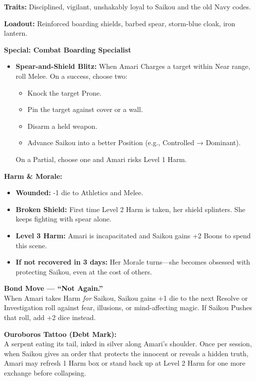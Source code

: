 \documentclass[11pt]{article}
\begin{document}
\textbf{Traits:}
Disciplined, vigilant, unshakably loyal to Saikou and the old Navy codes.

\textbf{Loadout:}
Reinforced boarding shields, barbed spear, storm-blue cloak, iron lantern.

\textbf{Special: Combat Boarding Specialist}
\begin{itemize}
  \item \textbf{Spear-and-Shield Blitz:} When Amari Charges a target within Near range, roll Melee. On a success, choose two:
  \begin{itemize}
    \item Knock the target Prone.
    \item Pin the target against cover or a wall.
    \item Disarm a held weapon.
    \item Advance Saikou into a better Position (e.g., Controlled → Dominant).
  \end{itemize}
  On a Partial, choose one and Amari risks Level 1 Harm.
\end{itemize}

\textbf{Harm \& Morale:}
\begin{itemize}
  \item \textbf{Wounded:} -1 die to Athletics and Melee.
  \item \textbf{Broken Shield:} First time Level 2 Harm is taken, her shield splinters. She keeps fighting with spear alone.
  \item \textbf{Level 3 Harm:} Amari is incapacitated and Saikou gains +2 Boons to spend this scene.
  \item \textbf{If not recovered in 3 days:} Her Morale turns---she becomes obsessed with protecting Saikou, even at the cost of others.
\end{itemize}

\textbf{Bond Move --- ``Not Again.''}\\
When Amari takes Harm \emph{for} Saikou, Saikou gains +1 die to the next Resolve or Investigation roll against fear, illusions, or mind-affecting magic.  
If Saikou Pushes that roll, add +2 dice instead.

\textbf{Ouroboros Tattoo (Debt Mark):}\\
A serpent eating its tail, inked in silver along Amari's shoulder.  
Once per session, when Saikou gives an order that protects the innocent or reveals a hidden truth, Amari may refresh 1 Harm box or stand back up at Level 2 Harm for one more exchange before collapsing.
\end{document}
